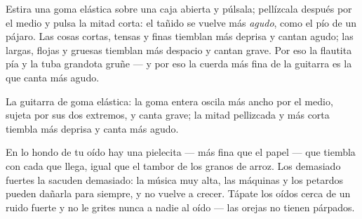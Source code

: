 \begin{example}\label{ex:g3:sound-around-us:pitch}
Estira una goma elástica sobre una caja abierta y púlsala; pellízcala
después por el medio y pulsa la mitad corta: el tañido se vuelve más
\emph{agudo}, como el pío de un pájaro. Las cosas cortas, tensas y
finas tiemblan más deprisa y cantan agudo; las largas, flojas y
gruesas tiemblan más despacio y cantan grave. Por eso la flautita pía
y la tuba grandota gruñe --- y por eso la cuerda más fina de la
guitarra es la que canta más agudo.
\end{example}

\begin{omfigure}

{\small La guitarra de goma elástica: la goma entera oscila más ancho
por el medio, sujeta por sus dos extremos, y canta grave; la mitad
pellizcada y más corta tiembla más deprisa y canta más agudo.}
\end{omfigure}

\begin{remark}\label{rem:g3:sound-around-us:ears}
En lo hondo de tu oído hay una pielecita --- más fina que el papel ---
que tiembla con cada  que llega, igual que el tambor de los
granos de arroz. Los  demasiado fuertes la sacuden demasiado:
la música muy alta, las máquinas y los petardos pueden dañarla para
siempre, y no vuelve a crecer. Tápate los oídos cerca de un ruido
fuerte y no le grites nunca a nadie al oído --- las orejas no tienen
párpados.
\end{remark}

